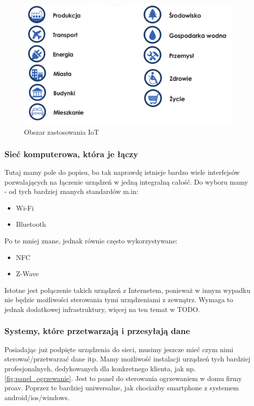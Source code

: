 \begin{figure}[!htbp]
	\centering
	\includegraphics[width=1.0\textwidth]{images/zastosowania.png}
	\caption[Obszar zastosowania IoT.]{Obszar zastosowania IoT}
	\label{fig:zastosowania_iot}
\end{figure}
\subsubsection{Sieć komputerowa, która je łączy}
Tutaj mamy pole do popisu, bo tak naprawdę istnieje bardzo wiele interfejsów pozwalających na łączenie urządzeń w jedną integralną całość. Do wyboru mamy - od tych bardziej znanych standardów m.in:

\begin{itemize}
	\item Wi-Fi
	\item Bluetooth
\end{itemize}
Po te mniej znane, jednak równie często wykorzystywane:
\begin{itemize}
	\item NFC 
	\item Z-Wave 
\end{itemize}
Istotne jest połączenie takich urządzeń z Internetem, ponieważ w innym wypadku nie będzie możliwości sterowania tymi urządzeniami z zewnątrz. Wymaga to jednak dodatkowej infrastruktury, więcej na ten temat w TODO.

\subsubsection{Systemy, które przetwarzają i przesyłają dane}
Posiadając już podpięte urządzenia do sieci, musimy jeszcze mieć czym nimi sterować/przetwarzać dane itp. Mamy możliwość instalacji urządzeń tych bardziej profesjonalnych, dedykowanych dla konkretnego klienta, jak np. \autoref{fig:panel_ogrzewanie}. Jest to panel do sterowania ogrzewaniem w domu firmy proav. Poprzez te bardziej uniwersalne, jak chociażby smartphone z systemem android/ios/windows.

